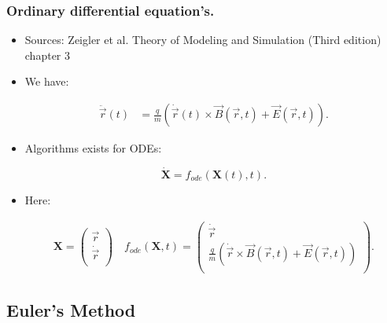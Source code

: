 \documentclass{beamer}
\newcommand{\mvec}[2]{
\ensuremath{\left(
\begin{array}{c}
#1\\
#2\\
\end{array}
\right)}
}
\begin{document}
\begin{frame}
\frametitle{Ordinary differential equation's.}
\begin{itemize}
\item<1-> {\color{gray} Sources: Zeigler et al. Theory of Modeling and Simulation (Third edition) chapter 3}

\item<1-> We have:

\begin{align*}
\ddot{\vec{r}}(t) &= \frac{q}{m} ( \dot{\vec{r}}(t)\times \vec{B}(\vec{r},t)+\vec{E}(\vec{r},t)).
\end{align*}

\item<1-> Algorithms exists for ODEs:

\begin{equation*}
\dot{\mathbf{X}} = f_{ode}(\mathbf{X}(t),t).
\end{equation*}


\item<1-> Here:

\begin{align*}
\mathbf{X} = \mvec{\vec{r}}{\dot{\vec{r}}} \quad f_{ode}(\mathbf{X},t) = \mvec{\dot{\vec{r}}}{\frac{q}{m} ( \dot{\vec{r}}\times \vec{B}(\vec{r},t)+\vec{E}(\vec{r},t))}.
\end{align*}
\end{itemize}
\end{frame}

\subsection{Euler's Method}
\end{document}
